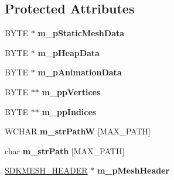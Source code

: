\subsection*{Protected Attributes}
\begin{DoxyCompactItemize}
\item 
\hypertarget{class_c_d_x_u_t_s_d_k_mesh_ac5d3fc8b4370d9ec522638ed254933aa}{B\+Y\+T\+E $\ast$ {\bfseries m\+\_\+p\+Static\+Mesh\+Data}}\label{class_c_d_x_u_t_s_d_k_mesh_ac5d3fc8b4370d9ec522638ed254933aa}

\item 
\hypertarget{class_c_d_x_u_t_s_d_k_mesh_a15020296d4050f8ea013bba26d8ae7cf}{B\+Y\+T\+E $\ast$ {\bfseries m\+\_\+p\+Heap\+Data}}\label{class_c_d_x_u_t_s_d_k_mesh_a15020296d4050f8ea013bba26d8ae7cf}

\item 
\hypertarget{class_c_d_x_u_t_s_d_k_mesh_a7f92997303751c8cc1ff4f232fc211c8}{B\+Y\+T\+E $\ast$ {\bfseries m\+\_\+p\+Animation\+Data}}\label{class_c_d_x_u_t_s_d_k_mesh_a7f92997303751c8cc1ff4f232fc211c8}

\item 
\hypertarget{class_c_d_x_u_t_s_d_k_mesh_ab2195495d45d1c782662cdc0c1d76aac}{B\+Y\+T\+E $\ast$$\ast$ {\bfseries m\+\_\+pp\+Vertices}}\label{class_c_d_x_u_t_s_d_k_mesh_ab2195495d45d1c782662cdc0c1d76aac}

\item 
\hypertarget{class_c_d_x_u_t_s_d_k_mesh_af30f73300fbf0190453490d5cd3aee98}{B\+Y\+T\+E $\ast$$\ast$ {\bfseries m\+\_\+pp\+Indices}}\label{class_c_d_x_u_t_s_d_k_mesh_af30f73300fbf0190453490d5cd3aee98}

\item 
\hypertarget{class_c_d_x_u_t_s_d_k_mesh_ac614dc8e1a7e66981b918c2f993cece1}{W\+C\+H\+A\+R {\bfseries m\+\_\+str\+Path\+W} \mbox{[}M\+A\+X\+\_\+\+P\+A\+T\+H\mbox{]}}\label{class_c_d_x_u_t_s_d_k_mesh_ac614dc8e1a7e66981b918c2f993cece1}

\item 
\hypertarget{class_c_d_x_u_t_s_d_k_mesh_a8353965ccfd0a11b2ba7f54d87cce3f0}{char {\bfseries m\+\_\+str\+Path} \mbox{[}M\+A\+X\+\_\+\+P\+A\+T\+H\mbox{]}}\label{class_c_d_x_u_t_s_d_k_mesh_a8353965ccfd0a11b2ba7f54d87cce3f0}

\item 
\hypertarget{class_c_d_x_u_t_s_d_k_mesh_aada82e5912889e74b9f325c1d7f46dfd}{\hyperlink{struct_s_d_k_m_e_s_h___h_e_a_d_e_r}{S\+D\+K\+M\+E\+S\+H\+\_\+\+H\+E\+A\+D\+E\+R} $\ast$ {\bfseries m\+\_\+p\+Mesh\+Header}}\label{class_c_d_x_u_t_s_d_k_mesh_aada82e5912889e74b9f325c1d7f46dfd}


\end{DoxyCompactItemize}
